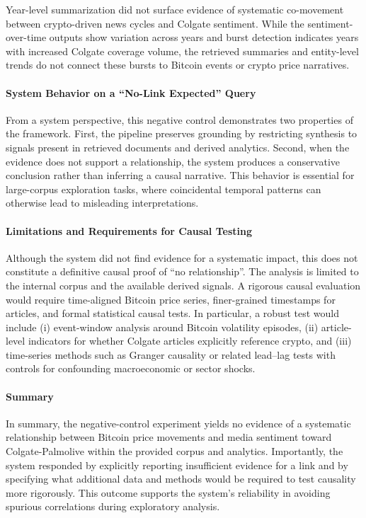 Year-level summarization did not surface evidence of systematic co-movement between crypto-driven news cycles and Colgate sentiment. While the sentiment-over-time outputs show variation across years and burst detection indicates years with increased Colgate coverage volume, the retrieved summaries and entity-level trends do not connect these bursts to Bitcoin events or crypto price narratives.

\paragraph{System Behavior on a ``No-Link Expected'' Query}

From a system perspective, this negative control demonstrates two properties of the framework. First, the pipeline preserves grounding by restricting synthesis to signals present in retrieved documents and derived analytics. Second, when the evidence does not support a relationship, the system produces a conservative conclusion rather than inferring a causal narrative. This behavior is essential for large-corpus exploration tasks, where coincidental temporal patterns can otherwise lead to misleading interpretations.

\paragraph{Limitations and Requirements for Causal Testing}

Although the system did not find evidence for a systematic impact, this does not constitute a definitive causal proof of ``no relationship''. The analysis is limited to the internal corpus and the available derived signals. A rigorous causal evaluation would require time-aligned Bitcoin price series, finer-grained timestamps for articles, and formal statistical causal tests. In particular, a robust test would include (i) event-window analysis around Bitcoin volatility episodes, (ii) article-level indicators for whether Colgate articles explicitly reference crypto, and (iii) time-series methods such as Granger causality or related lead--lag tests with controls for confounding macroeconomic or sector shocks.

\paragraph{Summary}

In summary, the negative-control experiment yields no evidence of a systematic relationship between Bitcoin price movements and media sentiment toward Colgate-Palmolive within the provided corpus and analytics. Importantly, the system responded by explicitly reporting insufficient evidence for a link and by specifying what additional data and methods would be required to test causality more rigorously. This outcome supports the system's reliability in avoiding spurious correlations during exploratory analysis.

